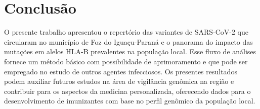\chapter{Conclusão}

\begin{justifying}

O presente trabalho apresentou o repertório das variantes de SARS-CoV-2 que circularam no município de Foz do Iguaçu-Paraná e o panorama do impacto das mutações em alelos HLA-B prevalentes na população local. Esse fluxo de análises fornece um método básico com possibilidade de aprimoramento e que pode ser empregado no estudo de outros agentes infecciosos. Os presentes resultados podem auxiliar futuros estudos na área de vigilância genômica na região e contribuir para os aspectos da medicina personalizada, oferecendo dados para o desenvolvimento de imunizantes com base no perfil genômico da população local.

\end{justifying}








